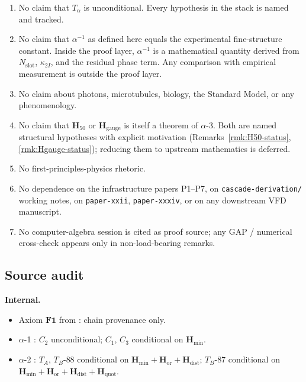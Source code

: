 \documentclass[11pt, a4paper]{amsart}
\theoremstyle{definition}
\newcommand{\Hmin}{\mathbf{H}_{\min}}
\newcommand{\Hor}{\mathbf{H}_{\mathrm{or}}}
\newcommand{\Hdist}{\mathbf{H}_{\mathrm{dist}}}
\newcommand{\Hquot}{\mathbf{H}_{\mathrm{quot}}}
\newcommand{\Hfifty}{\mathbf{H}_{50}}
\newcommand{\Hgauge}{\mathbf{H}_{\mathrm{gauge}}}
\newcommand{\Nslot}{N_{\mathrm{slot}}}
\newcommand{\kappaTwoI}{\kappa_{2I}}
\begin{document}
\begin{enumerate}
\item No claim that $T_\alpha$ is unconditional. Every
  hypothesis in the stack is named and tracked.
\item No claim that $\alpha^{-1}$ as defined here equals the
  experimental fine-structure constant. Inside the proof
  layer, $\alpha^{-1}$ is a mathematical quantity derived from
  $\Nslot$, $\kappaTwoI$, and the residual phase term. Any
  comparison with empirical measurement is outside the proof
  layer.
\item No claim about photons, microtubules, biology, the
  Standard Model, or any phenomenology.
\item No claim that $\Hfifty$ or $\Hgauge$ is itself a
  theorem of $\alpha$-3. Both are named structural
  hypotheses with explicit motivation
  (Remarks~\ref{rmk:H50-status}, \ref{rmk:Hgauge-status});
  reducing them to upstream mathematics is deferred.
\item No first-principles-physics rhetoric.
\item No dependence on the infrastructure papers P1--P7, on
  \texttt{cascade-derivation/} working notes, on
  \texttt{paper-xxii}, \texttt{paper-xxxiv}, or on any
  downstream VFD manuscript.
\item No computer-algebra session is cited as proof source;
  any GAP / numerical cross-check appears only in non-load-bearing
  remarks.
\end{enumerate}

\subsection{Source audit}

\textbf{Internal.}
\begin{itemize}
\item Axiom $\mathbf{F1}$ from
  \cite[\S F1]{CascadeFoundations}: chain provenance only.
\item $\alpha$-1 \cite{Cascade12D}: $C_2$ unconditional;
  $C_1$, $C_3$ conditional on $\Hmin$.
\item $\alpha$-2 \cite{CascadePhasonCoxeter}: $T_A$,
  $T_B$-$88$ conditional on $\Hmin + \Hor + \Hdist$;
  $T_B$-$87$ conditional on $\Hmin + \Hor + \Hdist + \Hquot$.
\end{itemize}
\end{document}
